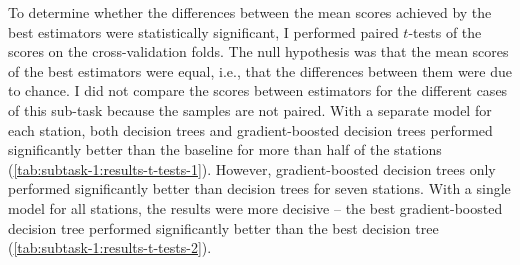 \documentclass[11pt]{extarticle}
\begin{document}
To determine whether the differences between the mean scores achieved by the best
estimators were statistically significant, I performed paired $t$-tests of the scores
on the cross-validation folds.
The null hypothesis was that the mean scores of the best estimators were equal, i.e.,
that the differences between them were due to chance.
I did not compare the scores between estimators for the different cases of this
sub-task because the samples are not paired.
With a separate model for each station, both decision trees and gradient-boosted
decision trees performed significantly better than the baseline for more than half of
the stations (\cref{tab:subtask-1:results-t-tests-1}).
However, gradient-boosted decision trees only performed significantly better than
decision trees for seven stations.
With a single model for all stations, the results were more decisive -- the best
gradient-boosted decision tree performed significantly better than the best decision
tree (\cref{tab:subtask-1:results-t-tests-2}).
\end{document}
